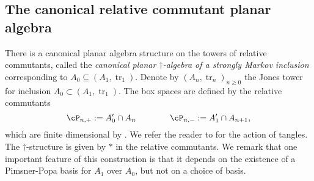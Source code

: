 \documentclass[11pt]{article}
\theoremstyle{plain}
\theoremstyle{definition}
\newtheorem{defn}[thm]{Definition}
\DeclareMathOperator{\Tr}{Tr}
\DeclareMathOperator{\tr}{tr}
\newcommand{\nn}[1]{\textcolor{red}{[[#1]]}}
\begin{document}
%
%
%


\subsection{The canonical relative commutant planar algebra}%
\label{sec:StronglyMarkovPA}


There is a canonical planar algebra structure on the towers of relative commutants, called the \textit{canonical planar $\dag$-algebra of a strongly Markov inclusion} corresponding to $A_0\subseteq (A_1,\tr_1)$. 
Denote by $(A_n,\tr_n)_{n\geq 0}$ the Jones tower for inclusion $A_0\subset (A_1,\tr_1)$.
The box spaces are defined by the relative commutants
$$
\cP_{n,+}:=A_0'\cap A_{n} 
\qquad\qquad
\cP_{n,-}:=A_1'\cap A_{n+1},
$$
which are finite dimensional by \cite[Prop.~2.7.3]{MR996807}.
We refer the reader to \cite[\S2.3]{MR2812459} for the action of tangles.
The $\dag$-structure is given by $*$ in the relative commutants. 
We remark that one important feature of this construction is that it depends on the existence of a Pimsner-Popa basis for $A_1$ over $A_0$, but not on a choice of basis. 
\end{document}
